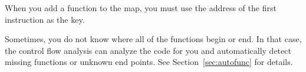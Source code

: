 When you add a function to the map, you must use the address of the first instruction as the key.

Sometimes, you do not know where all of the functions begin or end. In that case, the control flow analysis can analyze the code for you and automatically detect missing functions or unknown end points. See Section~\vref{sec:autofunc} for details.
